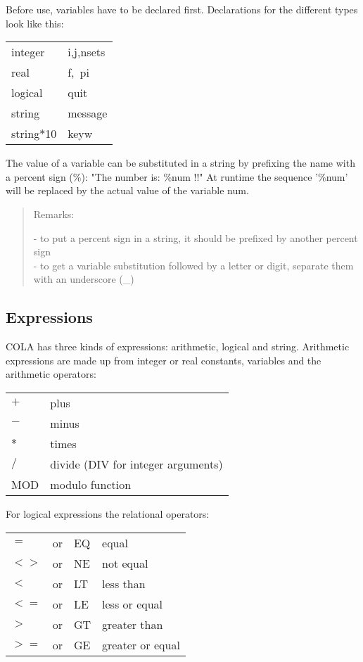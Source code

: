 Before use, variables have to be declared first.  Declarations
for the different types look like this:\\

\begin{tabular}{ l l }
  integer   & i,j,nsets\\
  real      & f,\ pi\\
  logical   & quit\\
  string    & message\\
  string$\ast$10 & keyw\\
\end{tabular}


The value of a variable can be substituted in a string by
prefixing the name with a percent sign (\%):
"The number is: \%num !!"
At runtime the sequence '\%num' will be replaced by the actual
value of the variable num.

\begin{verse}
  Remarks:

- to put a percent sign in a string, it should be prefixed by
  another percent sign\\
- to get a variable substitution followed by a letter or digit,
  separate them with an underscore (\_)\\
\end{verse}


\subsection*{Expressions}

COLA has three kinds of expressions: arithmetic, logical and
string. Arithmetic expressions are made up from integer or real
constants, variables and the arithmetic operators:

\begin{tabular}{l l}
             $+$ &     plus \\
             $-$ &     minus\\
             $*$ &     times\\
             $/$ &     divide (DIV for integer arguments)\\
             MOD &    modulo function\\
\end{tabular}

For logical expressions the relational operators:\\

\begin{tabular}{l l l l}

             $ = $  & or &   EQ &     equal\\
             $ <>$  & or &   NE &     not equal\\
             $ < $  & or &   LT &     less than\\
             $ <=$  & or &   LE &     less or equal\\
             $ > $  & or &   GT &     greater than\\
             $ >=$  & or &   GE &     greater or equal\\
\end{tabular}

